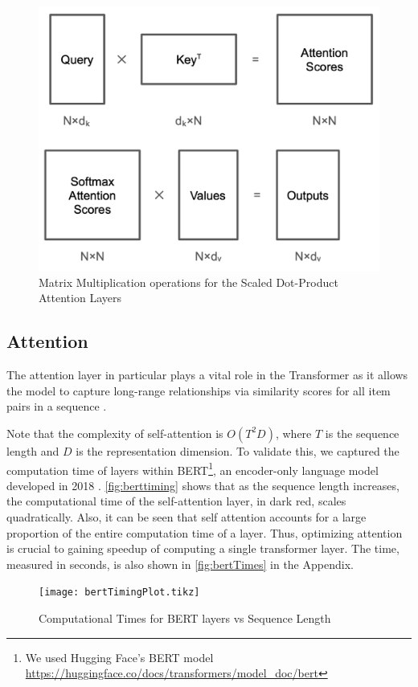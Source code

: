 \documentclass[11pt]{article}
\begin{document}
\begin{figure}[t]
  \centering
  \includegraphics[width=\linewidth]{figures/qkvattn.png}
  \caption{Matrix Multiplication operations for the Scaled Dot-Product Attention Layers}
 \label{fig:qkvmats}
\end{figure}
\subsection{Attention}
The attention layer in particular plays a vital role in the Transformer as it allows the model to capture long-range relationships via similarity scores for all item pairs in a sequence \cite{khan2022transformers}.

Note that the complexity of self-attention is $O(T^2D)$, where $T$ is the sequence length and $D$ is the representation dimension. To validate this, we captured the computation time of layers within BERT\footnote{We used Hugging Face's BERT model \url{https://huggingface.co/docs/transformers/model_doc/bert}}, an encoder-only language model developed in 2018 \cite{devlin2018bert}. \autoref{fig:berttiming} shows that as the sequence length increases, the computational time of the self-attention layer, in dark red, scales quadratically. Also, it can be seen that self attention accounts for a large proportion of the entire computation time of a layer. Thus, optimizing attention is crucial to gaining speedup of computing a single transformer layer. The time, measured in seconds, is also shown in \autoref{fig:bertTimes} in the Appendix.
\begin{figure}[ht]
\testdata
    \centering
    \texttt{[image: bertTimingPlot.tikz]}
    \caption{Computational Times for BERT layers vs Sequence Length}
    \label{fig:berttiming}
\end{figure}
\end{document}
